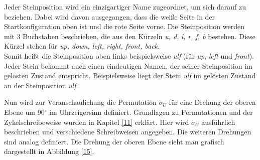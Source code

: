 \documentclass[12pt,a4paper, usenames, dvipsnames]{article}
\begin{document}
Jeder Steinposition wird ein einzigartiger Name zugeordnet, um sich darauf zu beziehen. Dabei wird davon ausgegangen, dass die weiße Seite in der Startkonfiguration oben ist und die rote Seite vorne. Die Steinposition werden mit 3 Buchstaben beschrieben, die aus den Kürzeln \textit{u, d, l, r, f, b} bestehen. Diese Kürzel stehen für \textit{up, down, left, right, front, back}. \\
Somit heißt die Steinposition oben links beispielsweise \textit{ulf} (für \textit{up}, \textit{left} und \textit{front}). 
Jeder Stein bekommt auch einen eindeutigen Namen, der seiner Steinposition im gelösten Zustand entspricht. Beispielsweise liegt der Stein \textit{ulf} im gelösten Zustand an der Steinposition \textit{ulf}.

Nun wird zur Veranschaulichung die Permutation $\sigma_U$ für eine Drehung der oberen Ebene um 90$^\circ$ im Uhrzeigersinn definiert. Grundlagen zu Permutationen und der Zykelschreibeweise wurden in Kapitel \ref{11} erklärt.
Hier wird $\sigma_U$ ausführlich beschrieben und verschiedene Schreibweisen angegeben. Die weiteren Drehungen sind analog definiert. 
Die Drehung der oberen Ebene sieht man grafisch dargestellt in Abbildung \ref{15}.
\end{document}
